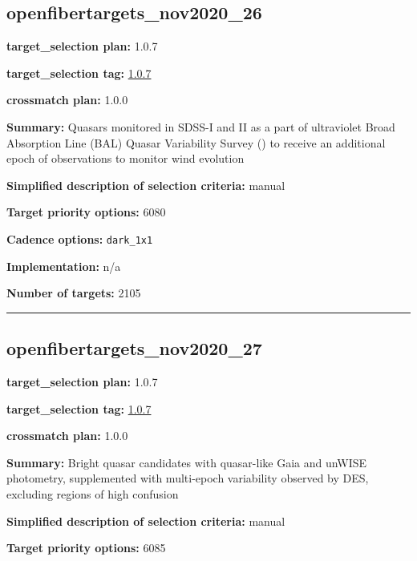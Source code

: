 \hypertarget{openfibertargets_nov2020_26_plan1.0.7}{%
\subsection{openfibertargets\_nov2020\_26}\label{openfibertargets_nov2020_26_plan1.0.7}}

\noindent\textbf{target\_selection plan:} 1.0.7

\noindent\textbf{target\_selection tag:}
\href{https://github.com/sdss/target_selection/tree/1.0.7/}{1.0.7}

\noindent\textbf{crossmatch plan:} 1.0.0

\noindent\textbf{Summary:} Quasars monitored in SDSS-I and II as a part of
ultraviolet Broad Absorption Line (BAL) Quasar Variability Survey
(\citealt{Gibson2009}) to receive an additional epoch of observations to monitor
wind evolution

\noindent\textbf{Simplified description of selection criteria:} manual


\noindent\textbf{Target priority options:} 6080

\noindent\textbf{Cadence options:} \texttt{dark\_1x1}

\noindent\textbf{Implementation:} n/a

\noindent\textbf{Number of targets:} 2105

\begin{center}\rule{0.5\linewidth}{0.5pt}\end{center}

\hypertarget{openfibertargets_nov2020_27_plan1.0.7}{%
\subsection{openfibertargets\_nov2020\_27}\label{openfibertargets_nov2020_27_plan1.0.7}}

\noindent\textbf{target\_selection plan:} 1.0.7

\noindent\textbf{target\_selection tag:}
\href{https://github.com/sdss/target_selection/tree/1.0.7/}{1.0.7}

\noindent\textbf{crossmatch plan:} 1.0.0

\noindent\textbf{Summary:} Bright quasar candidates with quasar-like Gaia and
unWISE photometry, supplemented with multi-epoch variability observed by
DES, excluding regions of high confusion

\noindent\textbf{Simplified description of selection criteria:} manual


\noindent\textbf{Target priority options:} 6085

